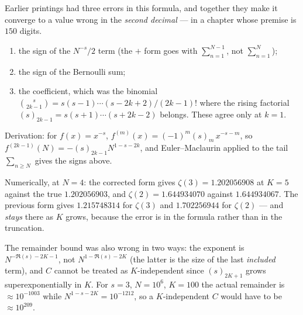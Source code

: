 \begin{remark}
\label{rem:euler-maclaurin-2026-10-03}
Earlier printings had three errors in this formula, and together they make it
converge to a value wrong in the \emph{second decimal} --- in a chapter whose
premise is $150$ digits.

\begin{enumerate}
\item the sign of the $N^{-s}/2$ term (the $+$ form goes with
  $\sum_{n=1}^{N-1}$, not $\sum_{n=1}^{N}$);
\item the sign of the Bernoulli sum;
\item the coefficient, which was the binomial
  $\binom{s}{2k-1} = s(s-1)\cdots(s-2k+2)/(2k-1)!$ where the rising factorial
  $(s)_{2k-1} = s(s+1)\cdots(s+2k-2)$ belongs. These agree only at $k = 1$.
\end{enumerate}

\noindent Derivation: for $f(x) = x^{-s}$,
$f^{(m)}(x) = (-1)^m (s)_m\, x^{-s-m}$, so
$f^{(2k-1)}(N) = -(s)_{2k-1} N^{1-s-2k}$, and Euler--Maclaurin applied to the
tail $\sum_{n \geq N}$ gives the signs above.

Numerically, at $N = 4$: the corrected form gives $\zeta(3) = 1.202056908$ at
$K = 5$ against the true $1.202056903$, and $\zeta(2) = 1.644934070$ against
$1.644934067$. The previous form gives $\mathbf{1.215748314}$ for $\zeta(3)$ and
$\mathbf{1.702256944}$ for $\zeta(2)$ --- and \emph{stays} there as $K$ grows,
because the error is in the formula rather than in the truncation.

The remainder bound was also wrong in two ways: the exponent is
$N^{-\Re(s)-2K-1}$, not $N^{1-\Re(s)-2K}$ (the latter is the size of the last
\emph{included} term), and $C$ cannot be treated as $K$-independent since
$(s)_{2K+1}$ grows superexponentially in $K$. For $s = 3$, $N = 10^6$,
$K = 100$ the actual remainder is $\approx 10^{-1003}$ while
$N^{1-s-2K} = 10^{-1212}$, so a $K$-independent $C$ would have to be
$\approx 10^{209}$.
\end{remark}

